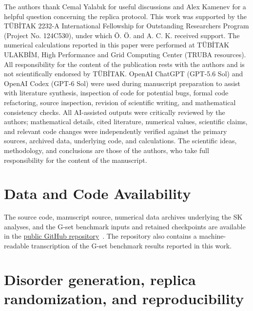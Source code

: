 \documentclass[
reprint,
amsmath,amssymb,
aps,
pre,
floatfix,
]{revtex4-2}
\begin{document}
\begin{acknowledgments}
The authors thank Cemal Yalabık for useful discussions and Alex Kamenev
for a helpful question concerning the replica protocol. This work was supported by the TÜBİTAK 2232-A International Fellowship for
Outstanding Researchers Program (Project No. 124C530), under which
Ö. Ö. and A. C. K. received support. The numerical calculations reported
in this paper were performed at TÜBİTAK ULAKBİM, High Performance and Grid
Computing Center (TRUBA resources). All responsibility for the content of
the publication rests with the authors and is not scientifically
endorsed by TÜBİTAK. OpenAI ChatGPT (GPT-5.6 Sol) and OpenAI Codex (GPT-6 Sol) were used
during manuscript preparation to assist with literature synthesis,
inspection of code for potential bugs,  formal code
refactoring, source inspection, revision of scientific writing, and
mathematical consistency checks. All AI-assisted
outputs were critically reviewed by the authors; mathematical details,
cited literature, numerical values, scientific claims, and relevant code
changes were independently verified against the primary sources,
archived data, underlying code, and calculations. The scientific ideas,
methodology, and conclusions are those of the authors, who take full
responsibility for the content of the manuscript.
\end{acknowledgments}

\section*{Data and Code Availability}


The source code, manuscript source, numerical data archives underlying the
SK analyses, and the G-set benchmark inputs and retained checkpoints are
available in the
\href{https://github.com/omeronder2604/Statistical-Landscape-Exploration-and-Weak-Field-Defects-in-Selective-Oscillator-Ising-Machines}
{public GitHub repository}~\cite{OIMplusRepository}.
The repository also contains a machine-readable transcription of the G-set
benchmark results reported in this work.

\appendix
\section{Disorder generation, replica randomization, and reproducibility}
\label{app:randomization}
\end{document}
